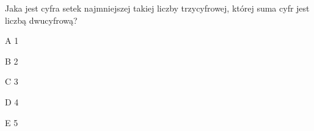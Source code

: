 \begin{tresc}
Jaka jest cyfra setek najmniejszej takiej liczby trzycyfrowej, której suma cyfr jest liczbą dwucyfrową?
\end{tresc}
\begin{wariant}{A} 1 \end{wariant}
\begin{wariant}{B} 2 \end{wariant}
\begin{wariant}{C} 3 \end{wariant}
\begin{wariant}{D} 4 \end{wariant}
\begin{wariant}{E} 5 \end{wariant}
